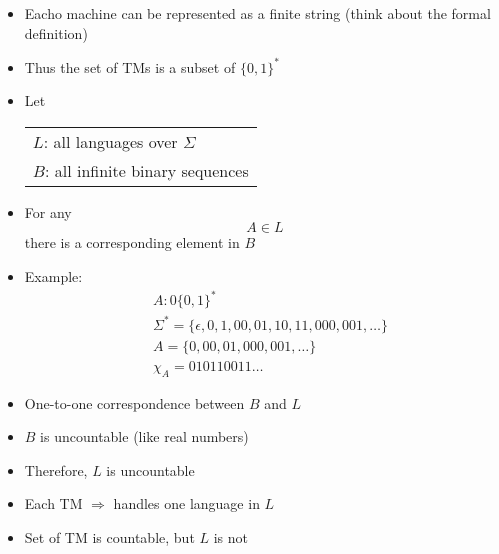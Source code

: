\begin{frame}[allowframebreaks]
\begin{itemize}
\item Eacho machine can be represented as a finite string
  (think about the formal definition)

\item Thus the set of TMs is a subset of $\{0,1\}^*$

\item Let
  \begin{center}
    \begin{tabular}{l}
 $L$: all languages over $\Sigma$ \\
 $B$: all infinite binary sequences
    \end{tabular}
\end{center}
\item For any
  \begin{equation*}
  A\in L
\end{equation*}
there is a corresponding element in $B$
\item Example:
\begin{equation*}
\begin{split}
& A: 0 \{0,1\}^*\\
& \Sigma^*=\{\epsilon,0,1,00,01,10,11,000,001,\ldots\}\\
& A=\{0, 00, 01, 000, 001, \ldots\}\\
& \chi_A= 0 1 0 11 00 11 \ldots
\end{split}
\end{equation*}

\item One-to-one correspondence between $B$ and $L$

\item $B$ is uncountable (like real numbers)

\item [] Therefore, $L$ is uncountable
\item Each TM $\Rightarrow$ handles one language in $L$

\item [] Set of TM is countable, but $L$ is not


\end{itemize}
\end{frame}
